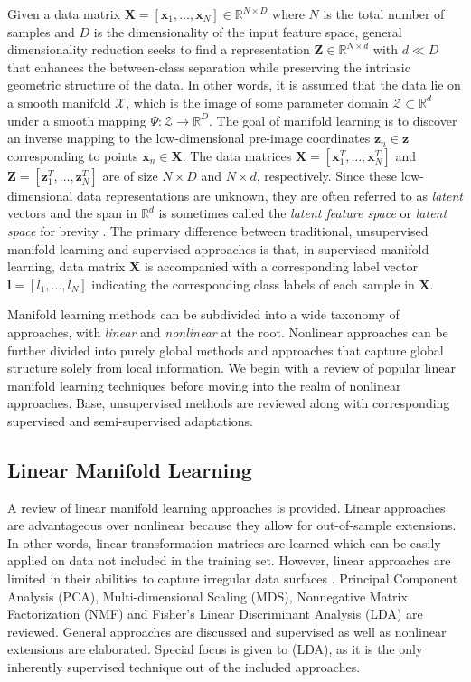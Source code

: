 Given a data matrix $\bm{X} = [\bm{x}_1, \dots, \bm{x}_N]\in \mathbb{R}^{N \times D}$ where $N$ is the total number of samples and $D$ is the dimensionality of the input feature space, general dimensionality reduction seeks to find a representation $\bm{Z} \in \mathbb{R}^{N \times d}$ with $d \ll D$ that enhances the between-class separation while preserving the intrinsic geometric structure of the data\citep{Vural2018StudySupervisedManifoldLearning}.  In other words, it is assumed that the data lie on a smooth manifold $\mathcal{X}$, which is the image of some parameter domain $\mathcal{Z} \subset \mathbb{R}^{d}$ under a smooth mapping $\Psi : \mathcal{Z} \rightarrow \mathbb{R}^{D}$.  The goal of manifold learning is to discover an inverse mapping to the low-dimensional pre-image coordinates $\bm{z}_n \in \bm{z}$ corresponding to points $\bm{x}_n \in \bm{X}$.  The data matrices $\bm{X} = [\bm{x}^{T}_{1}, \dots, \bm{x}^{T}_{N}]$ and $\bm{Z} = [\bm{z}^{T}_{1}, \dots, \bm{z}^{T}_{N}]$ are of size $N \times D$ and $N \times d$, respectively.  Since these low-dimensional data representations are unknown, they are often referred to as \textit{latent} vectors and the span in $\mathbb{R}^d$ is sometimes called the \textit{latent feature space} or \textit{latent space} for brevity \citep{Murphy2012}. The primary difference between traditional, unsupervised manifold learning and supervised approaches is that, in supervised manifold learning, data matrix $\bm{X} $ is accompanied with a corresponding label vector $\bm{l} = [l_1, \dots, l_N]$ indicating the corresponding class labels of each sample in $\bm{X}$. \newline

Manifold learning methods can be subdivided into a wide taxonomy of approaches, with \textit{linear} and \textit{nonlinear} at the root. Nonlinear approaches can be further divided into purely global methods and approaches that capture global structure solely from local information.  We begin with a review of popular linear manifold learning techniques before moving into the realm of nonlinear approaches. Base, unsupervised methods are reviewed along with corresponding supervised and semi-supervised adaptations. 

\subsection{Linear Manifold Learning}
A review of linear manifold learning approaches is provided.  Linear approaches are advantageous over nonlinear because they allow for out-of-sample extensions.  In other words, linear transformation matrices are learned which can be easily applied on data not included in the training set.  However, linear approaches are limited in their abilities to capture irregular data surfaces \citep{Kegl2008PrincipalManifoldsTextbook}.  Principal Component Analysis (PCA), Multi-dimensional Scaling (MDS), Nonnegative Matrix Factorization (NMF) and Fisher's Linear Discriminant Analysis (LDA) are reviewed.  General approaches are discussed and supervised as well as nonlinear extensions are elaborated. Special focus is given to (LDA), as it is the only inherently supervised technique out of the included approaches.

